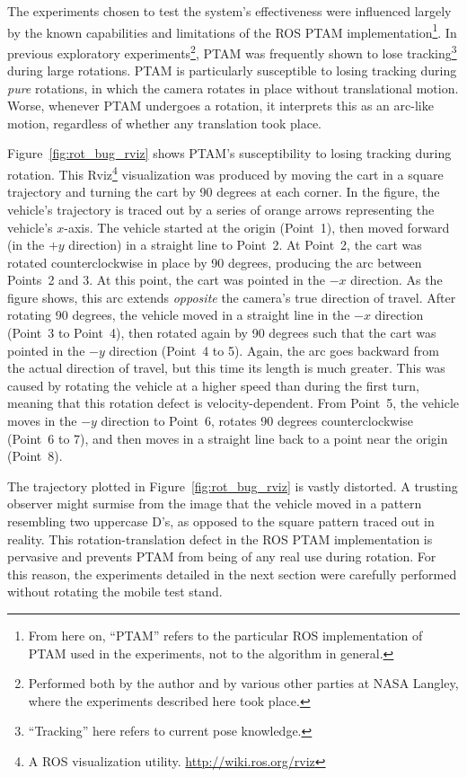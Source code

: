 The experiments chosen to test the system's effectiveness were influenced largely by the known capabilities and limitations of the ROS PTAM implementation\footnote{From here on, ``PTAM'' refers to the particular ROS implementation of PTAM used in the experiments, not to the algorithm in general.}. In previous exploratory experiments\footnote{Performed both by the author and by various other parties at NASA Langley, where the experiments described here took place.}, PTAM was frequently shown to lose tracking\footnote{``Tracking'' here refers to current pose knowledge.} during large rotations. PTAM is particularly susceptible to losing tracking during \textit{pure} rotations, in which the camera rotates in place without translational motion. Worse, whenever PTAM undergoes a rotation, it interprets this as an arc-like motion, regardless of whether any translation took place.

Figure~\ref{fig:rot_bug_rviz} shows PTAM's susceptibility to losing tracking during rotation. This Rviz\footnote{A ROS visualization utility. \url{http://wiki.ros.org/rviz}} visualization was produced by moving the cart in a square trajectory and turning the cart by 90 degrees at each corner. In the figure, the vehicle's trajectory is traced out by a series of orange arrows representing the vehicle's $x$-axis. The vehicle started at the origin (Point~1), then moved forward (in the $+y$ direction) in a straight line to Point~2. At Point~2, the cart was rotated counterclockwise in place by 90 degrees, producing the arc between Points~2 and 3. At this point, the cart was pointed in the $-x$ direction. As the figure shows, this arc extends \textit{opposite} the camera's true direction of travel. After rotating 90 degrees, the vehicle moved in a straight line in the $-x$ direction (Point~3 to Point~4), then rotated again by 90 degrees such that the cart was pointed in the $-y$ direction (Point~4 to 5). Again, the arc goes backward from the actual direction of travel, but this time its length is much greater. This was caused by rotating the vehicle at a higher speed than during the first turn, meaning that this rotation defect is velocity-dependent. From Point~5, the vehicle moves in the $-y$ direction to Point~6, rotates 90 degrees counterclockwise (Point~6 to 7), and then moves in a straight line back to a point near the origin (Point~8).

The trajectory plotted in Figure~\ref{fig:rot_bug_rviz} is vastly distorted. A trusting observer might surmise from the image that the vehicle moved in a pattern resembling two uppercase D's, as opposed to the square pattern traced out in reality. This rotation-translation defect in the ROS PTAM implementation is pervasive and prevents PTAM from being of any real use during rotation. For this reason, the experiments detailed in the next section were carefully performed without rotating the mobile test stand.

